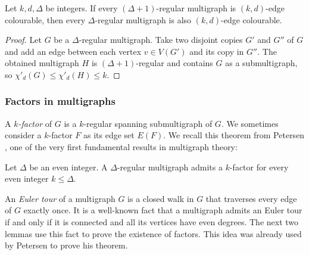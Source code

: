 \begin{lemma}\label{lem:chi_increasing}
Let $k, d, \Delta$ be integers. 
If every $(\Delta + 1)$-regular multigraph is $(k,d)$-edge colourable, then every $\Delta$-regular multigraph is also  $(k,d)$-edge colourable. 
\end{lemma}

\begin{proof}
Let $G$ be a $\Delta$-regular multigraph. 
Take two disjoint copies $G'$ and $G''$ of $G$ and add an edge between each vertex $v \in V(G')$ and its copy in $G''$. The obtained multigraph $H$ is $(\Delta+1)$-regular and contains $G$ as a submultigraph, so $\chi'_d(G) \leq \chi'_d(H) \leq k$. 
\end{proof}




\subsubsection*{Factors in multigraphs}

A \emph{$k$-factor} of $G$ is a $k$-regular spanning submultigraph of $G$. 
We sometimes consider a $k$-factor $F$ as its edge set $E(F)$. 
We recall this theorem from Petersen \cite{P91}, one of the very first fundamental results in multigraph theory:

\begin{theorem}
Let $\Delta$ be an even integer. A $\Delta$-regular multigraph admits a $k$-factor for every even integer $k \leq \Delta$. 
\end{theorem}

An \emph{Euler tour} of a multigraph $G$ is a closed walk in $G$ that traverses every edge of $G$ exactly once.   
It is a well-known fact that a multigraph admits an Euler tour if and only if it is connected and all its vertices have even degrees. 
The next two lemmas use this fact to prove the existence of factors. This idea was already used by Petersen to prove his theorem. 

